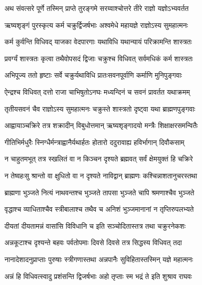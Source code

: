 
\twolineshloka
{अथ संवत्सरे पूर्णे तस्मिन् प्राप्ते तुरङ्गमे}
{सरय्वाश्चोत्तरे तीरे राज्ञो यज्ञोऽभ्यवर्तत} %

\twolineshloka
{ऋष्यशृङ्गं पुरस्कृत्य कर्म चक्रुर्द्विजर्षभाः}
{अश्वमेधे महायज्ञे राज्ञोऽस्य सुमहात्मनः} %

\twolineshloka
{कर्म कुर्वन्ति विधिवद् याजका वेदपारगाः}
{यथाविधि यथान्यायं परिक्रामन्ति शास्त्रतः} %

\twolineshloka
{प्रवर्ग्यं शास्त्रतः कृत्वा तथैवोपसदं द्विजाः}
{चक्रुश्च विधिवत् सर्वमधिकं कर्म शास्त्रतः} %

\twolineshloka
{अभिपूज्य ततो हृष्टाः सर्वे चक्रुर्यथाविधि}
{प्रातःसवनपूर्वाणि कर्माणि मुनिपुङ्गवाः} %

\twolineshloka
{ऐन्द्रश्च विधिवत् दत्तो राजा चाभिषुतोऽनघः}
{मध्यन्दिनं च सवनं प्रावर्तत यथाक्रमम्} %

\twolineshloka
{तृतीयसवनं चैव राज्ञोऽस्य सुमहात्मनः}
{चक्रुस्ते शास्त्रतो दृष्ट्वा यथा ब्राह्मणपुङ्गवाः} %

\twolineshloka
{आह्वायाञ्चक्रिरे तत्र शक्रादीन् विबुधोत्तमान्}
{ऋष्यशृङ्गादयो मन्त्रैः शिक्षाक्षरसमन्वितैः} %

\twolineshloka
{गीतिभिर्मधुरैः स्निग्धैर्मन्त्राह्वानैर्यथार्हतः}
{होतारो ददुरावाह्य हविर्भागान् दिवौकसाम्} %

\twolineshloka
{न चाहुतमभूत् तत्र स्खलितं वा न किञ्चन}
{दृश्यते ब्रह्मवत् सर्वं क्षेमयुक्तं हि चक्रिरे} %

\twolineshloka
{न तेष्वहःसु श्रान्तो वा क्षुधितो वा न दृश्यते}
{नाविद्वान् ब्राह्मणः कश्चिन्नाशतानुचरस्तथा} %

\twolineshloka
{ब्राह्मणा भुञ्जते नित्यं नाथवन्तश्च भुञ्जते}
{तापसा भुञ्जते चापि श्रमणाश्चैव भुञ्जते} %

\twolineshloka
{वृद्धाश्च व्याधिताश्चैव स्त्रीबालाश्च तथैव च}
{अनिशं भुञ्जमानानां न तृप्तिरुपलभ्यते} %

\twolineshloka
{दीयतां दीयतामन्नं वासांसि विविधानि च}
{इति सञ्चोदितास्तत्र तथा चक्रुरनेकशः} %

\twolineshloka
{अन्नकूटाश्च दृश्यन्ते बहवः पर्वतोपमाः}
{दिवसे दिवसे तत्र सिद्धस्य विधिवत् तदा} %

\twolineshloka
{नानादेशादनुप्राप्ताः पुरुषाः स्त्रीगणास्तथा}
{अन्नपानैः सुविहितास्तस्मिन् यज्ञे महात्मनः} %

\twolineshloka
{अन्नं हि विधिवत्स्वादु प्रशंसन्ति द्विजर्षभाः}
{अहो तृप्ताः स्म भद्रं ते इति शुश्राव राघवः} %

